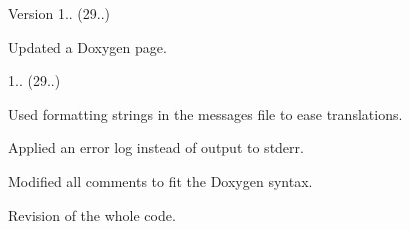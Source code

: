 \begin{DoxyVersion}{Version}
1.. (29..)
\begin{DoxyItemize}
\item Updated a Doxygen page. 
\end{DoxyItemize}

1.. (29..)
\begin{DoxyItemize}
\item Used formatting strings in the messages file to ease translations.
\item Applied an error log instead of output to stderr.
\item Modified all comments to fit the Doxygen syntax.
\item Revision of the whole code. 
\end{DoxyItemize}
\end{DoxyVersion}
